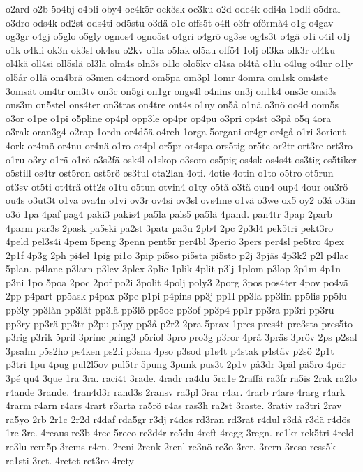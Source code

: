 {o2ard
o2b
5o4bj
o4bli
oby4
oc4k5r
ock3sk
oc3ku
o2d
ode4k
odi4a
1odli
o5dral
o3dro
ods4k
od2st
ods4ti
od5stu
o3dä
o1e
offs5t
o4fl
o3fr
oförmå4
o1g
o4gav
og3gr
o4gj
o5glo
o5gly
ognos4
ogno5st
o4gri
o4grö
og3se
og4s3t
o4gä
o1i
o4il
o1j
o1k
o4kli
ok3n
ok3sl
ok4su
o2kv
o1la
o5lak
ol5au
olfö4
1olj
ol3ka
olk3r
ol4ku
ol4kä
oll4si
oll5slä
ol3lä
olm4s
oln3s
o1lo
olo5kv
ol4sa
ol4tå
o1lu
o4lug
o4lur
o1ly
ol5år
o1lä
om4brä
o3men
o4mord
om5pa
om3pl
1omr
4omra
om1sk
om4ste
3omsät
om4tr
om3tv
on3c
on5gi
on1gr
ongs4l
o4nins
on3j
on1k4
ons3c
onsi3s
ons3m
on5stel
ons4ter
on3tras
on4tre
ont4s
o1ny
on5å
o1nä
o3nö
oo4d
oom5s
o3or
o1pe
o1pi
o5pline
op4pl
opp3le
op4pr
op4pu
o3pri
op4st
o3på
o5q
4ora
o3rak
oran3g4
o2rap
1ordn
or4d5ä
o4reh
1orga
5organi
or4gr
or4gå
o1ri
3orient
4ork
or4mö
or4nu
or4nä
o1ro
or4pl
or5pr
or4spa
ors5tig
or5te
or2tr
ort3re
ort3ro
o1ru
o3ry
o1rä
o1rö
o3s2fä
osk4l
o1skop
o3som
os5pig
os4sk
os4s4t
os3tig
os5tiker
o5still
os4tr
ost5ron
ost5rö
os3tul
ota2lan
4oti.
4otie
4otin
o1to
o5tro
ot5run
ot3sv
ot5ti
ot4trä
ott2s
o1tu
o5tun
otvin4
o1ty
o5tå
o3tä
oun4
oup4
4our
ou3rö
ou4s
o3ut3t
o1va
ova4n
o1vi
ov3r
ov4si
ov3sl
ovs4me
o1vä
o3we
ox5
oy2
o3å
o3än
o3ö
1pa
4paf
pag4
paki3
pakis4
pa5la
pals5
pa5lä
4pand.
pan4tr
3pap
2parb
4parm
par3s
2pask
pa5ski
pa2st
3patr
pa3u
2pb4
2pc
2p3d4
pek5tri
pekt3ro
4peld
pel3s4i
4pem
5peng
3penn
pent5r
per4bl
3perio
3pers
per4sl
pe5tro
4pex
2p1f
4p3g
2ph
pi4el
1pig
pi1o
3pip
pi5so
pi5sta
pi5sto
p2j
3pjäs
4p3k2
p2l
p4lac
5plan.
p4lane
p3larn
p3lev
3plex
3plic
1plik
4plit
p3lj
1plom
p3lop
2p1m
4p1n
p3ni
1po
5poa
2poc
2pof
po2i
3polit
4polj
poly3
2porg
3pos
pos4ter
4pov
po4vä
2pp
p4part
pp5ask
p4pax
p3pe
p1pi
p4pins
pp3j
pp1l
pp3la
pp3lin
pp5lis
pp5lu
pp3ly
pp3lån
pp3låt
pp3lä
pp3lö
pp5oc
pp3of
pp3p4
pp1r
pp3ra
pp3ri
pp3ru
pp3ry
pp3rä
pp3tr
p2pu
p5py
pp3å
p2r2
2pra
5prax
1pres
pres4t
pre3sta
pres5to
p3rig
p3rik
5pril
3princ
pring3
p5riol
3pro
pro3g
p3ror
4prå
3präs
3pröv
2ps
p2sal
3psalm
p5s2ho
ps4ken
ps2li
p3sna
4pso
p3sod
p1s4t
p4stak
p4stäv
p2sö
2p1t
p3tri
1pu
4pug
pul2l5ov
pul5tr
5pung
3punk
pus3t
2p1v
på3dr
3päl
pä5ro
4pör
3pé
qu4
3que
1ra
3ra.
raci4t
3rade.
4radr
ra4du
5ra1e
2raffä
ra3fr
ra5is
2rak
ra2lo
r4ande
3rande.
4ran4d3r
rand3s
2ransv
ra3pl
3rar
r4ar.
4rarb
r4are
4rarg
r4ark
4rarm
r4arn
r4ars
4rart
r3arta
ra5rö
r4as
ras3h
ra2st
3raste.
3rativ
ra3tri
2rav
ra5yo
2rb
2r1c
2r2d
r4daf
rda5gr
r3dj
r4dos
rd3ran
rd3rat
r4dul
r3då
r3dä
r4dös
1re
3re.
4reaus
re3b
4rec
5reco
re3d4r
re5du
4reft
4regg
3regn.
re1kr
rek5tri
4reld
re3lu
rem5p
3rems
r4en.
2reni
2renk
2renl
re3nö
re3o
3rer.
3rern
3reso
ress5k
re1sti
3ret.
4retet
ret3ro
4rety
}
